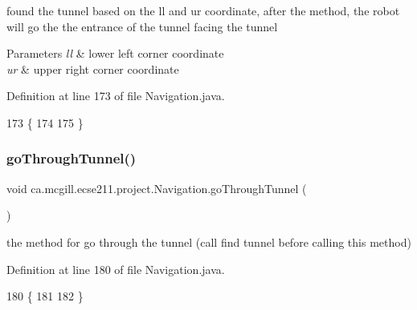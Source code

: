 found the tunnel based on the ll and ur coordinate, after the method, the robot will go the the entrance of the tunnel facing the tunnel 
\begin{DoxyParams}{Parameters}
{\em ll} & lower left corner coordinate \\
\hline
{\em ur} & upper right corner coordinate \\
\hline
\end{DoxyParams}


Definition at line 173 of file Navigation.\+java.


\begin{DoxyCode}
173                                              \{
174     
175   \}
\end{DoxyCode}
\mbox{\label{classca_1_1mcgill_1_1ecse211_1_1project_1_1_navigation_a4b52e605d3ea2f9bcd9481ae2c69ba39}} 
\subsubsection{\texorpdfstring{go\+Through\+Tunnel()}{goThroughTunnel()}}
{\footnotesize\ttfamily void ca.\+mcgill.\+ecse211.\+project.\+Navigation.\+go\+Through\+Tunnel (\begin{DoxyParamCaption}{ }\end{DoxyParamCaption})}

the method for go through the tunnel (call find tunnel before calling this method) 

Definition at line 180 of file Navigation.\+java.


\begin{DoxyCode}
180                                 \{
181     
182   \}
\end{DoxyCode}
\mbox{\label{classca_1_1mcgill_1_1ecse211_1_1project_1_1_navigation_a0016a23ab5d544148a09948fb1a40e4c}} 

